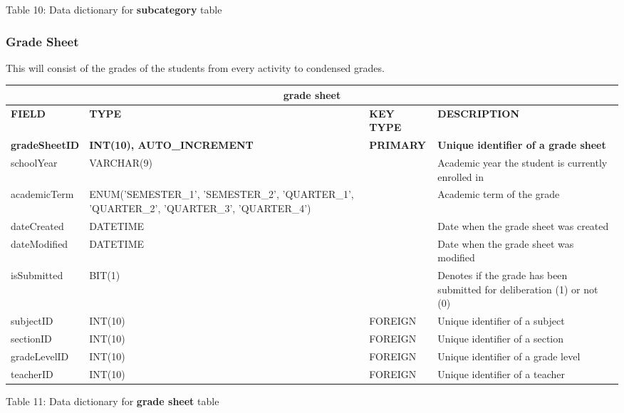 \documentclass[11pt,a4paper,titlepage]{article}
\begin{document}
\vspace{.5cm}
\begin{center}
    Table 10: Data dictionary for \textbf{subcategory} table
\end{center}

\newpage

\subsubsection{Grade Sheet}

This will consist of the grades of the students from every activity to condensed grades.

\vspace{1cm}
\begin{longtable}{ |p{2.5cm}|p{4.5cm}|p{2.5cm}|p{3cm}|  }
    \hline
    \multicolumn{4}{|c|}{\textbf{grade sheet}} \\
    \hline
    \textbf{FIELD}&\textbf{TYPE}&\textbf{KEY TYPE}&\textbf{DESCRIPTION}\\
    \hline
    \textbf{gradeSheetID}  & \textbf{INT(10), AUTO\_INCREMENT} & \textbf{PRIMARY} & \textbf{Unique identifier of a grade sheet}\\ \hline
    schoolYear   & VARCHAR(9)   & & Academic year the student is currently enrolled in\\ \hline
    academicTerm   & ENUM('SEMESTER\_1', 'SEMESTER\_2', 'QUARTER\_1', 'QUARTER\_2', 'QUARTER\_3', 'QUARTER\_4') &  & Academic term of the grade\\ \hline
    dateCreated   & DATETIME   & & Date when the grade sheet was created\\ \hline
    dateModified  & DATETIME   & & Date when the grade sheet was modified\\ \hline
    isSubmitted   & BIT(1)   & & Denotes if the grade has been submitted for deliberation (1) or not (0)\\ \hline
    subjectID   & INT(10)   & FOREIGN & Unique identifier of a subject\\ \hline
    sectionID   & INT(10)   & FOREIGN & Unique identifier of a section\\ \hline
    gradeLevelID   & INT(10)   & FOREIGN & Unique identifier of a grade level\\ \hline
    teacherID   & INT(10)   & FOREIGN & Unique identifier of a teacher\\ \hline
\end{longtable}
    
\vspace{.5cm}
\begin{center}
    Table 11: Data dictionary for \textbf{grade sheet} table
\end{center}
\end{document}
